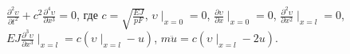 $\frac{\partial ^2\upsilon}{\partial t^2} +
c^2 \frac{\partial ^4\upsilon}{\partial x^3} = 0$,
где $c = \sqrt{\frac{EJ}{pF}}$, $\upsilon \mid _{x=0} = 0$,
$\frac{\partial\upsilon}{\partial x}\mid _{x=0} = 0$,
$\frac{\partial ^2\upsilon}{\partial x^2}\mid _{x = l} = 0$,
$EJ\frac{\partial ^3\upsilon}{\partial x^3}\mid _{x = l} =
c(\upsilon \mid _{x = l} - u)$,
$m\ddot{u} = c(\upsilon\mid _{x=l} - 2u)$.
